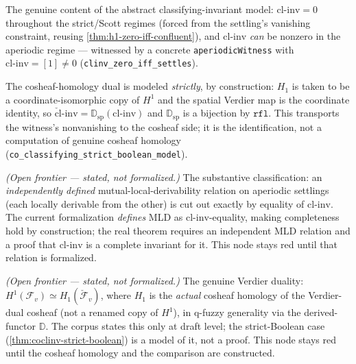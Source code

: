\begin{theorem}\label{thm:clinv-dichotomy}\leanok{}
The genuine content of the abstract classifying-invariant model: $\mathrm{cl\text{-}inv} = 0$
throughout the strict/Scott regimes (forced from the settling's vanishing constraint, reusing
\cref{thm:h1-zero-iff-confluent}), and $\mathrm{cl\text{-}inv}$ \emph{can} be nonzero in the
aperiodic regime --- witnessed by a concrete \texttt{aperiodicWitness} with
$\mathrm{cl\text{-}inv} = [1] \neq 0$ (\texttt{clinv\_zero\_iff\_settles}).
\end{theorem}

\begin{theorem}\label{thm:coclinv-strict-boolean}\leanok{}
The cosheaf-homology dual is modeled \emph{strictly}, by construction: $H_1$ is taken to be a
coordinate-isomorphic copy of $H^1$ and the spatial Verdier map is the coordinate identity, so
$\check{\mathrm{cl}}\text{-}\mathrm{inv} = \mathbb{D}_{\mathrm{sp}}(\mathrm{cl\text{-}inv})$ and
$\mathbb{D}_{\mathrm{sp}}$ is a bijection by $\mathtt{rfl}$. This transports the witness's
nonvanishing to the cosheaf side; it is the identification, not a computation of genuine
cosheaf homology (\texttt{co\_classifying\_strict\_boolean\_model}).
\end{theorem}

\begin{theorem}\label{thm:aperiodic-mld-classification}\notready{}
\emph{(Open frontier --- stated, not formalized.)} The substantive classification: an
\emph{independently defined} mutual-local-derivability relation on aperiodic settlings (each
locally derivable from the other) is cut out exactly by equality of $\mathrm{cl\text{-}inv}$.
The current formalization \emph{defines} MLD as $\mathrm{cl\text{-}inv}$-equality, making
completeness hold by construction; the real theorem requires an independent MLD relation and a
proof that $\mathrm{cl\text{-}inv}$ is a complete invariant for it. This node stays red until
that relation is formalized.
\end{theorem}

\begin{theorem}\label{thm:aperiodic-verdier-duality}\notready{}
\emph{(Open frontier --- stated, not formalized.)} The genuine Verdier duality:
$H^1(\mathcal{F}_v) \simeq H_1(\check{\mathcal{F}}_v)$, where $H_1$ is the \emph{actual} cosheaf
homology of the Verdier-dual cosheaf (not a renamed copy of $H^1$), in q-fuzzy generality via
the derived-functor $\mathbb{D}$. The corpus states this only at draft level; the strict-Boolean
case (\cref{thm:coclinv-strict-boolean}) is a model of it, not a proof. This node stays red
until the cosheaf homology and the comparison are constructed.
\end{theorem}

